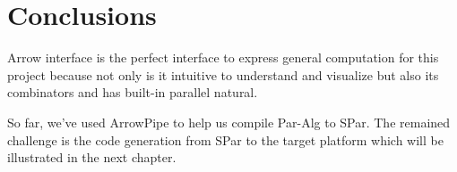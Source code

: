 \section{Conclusions}
Arrow interface is the perfect interface to express general computation for this project because not only is it intuitive to understand and visualize but also its combinators \hask{***} and \hask{&&&} has built-in parallel natural.

So far, we've used ArrowPipe to help us compile Par-Alg to SPar. The remained challenge is the code generation from SPar to the target platform which will be illustrated in the next chapter.
